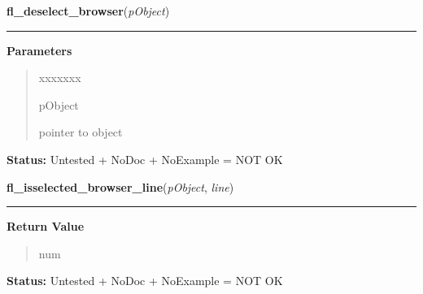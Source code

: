 \hspace{.8\funcindent}\begin{boxedminipage}{\funcwidth}

    \raggedright \textbf{fl\_deselect\_browser}(\textit{pObject})

    \vspace{-1.5ex}

    \rule{\textwidth}{0.5\fboxrule}
\setlength{\parskip}{2ex}
\setlength{\parskip}{1ex}
      \textbf{Parameters}
      \vspace{-1ex}

      \begin{quote}
        \begin{Ventry}{xxxxxxx}

          \item[pObject]

          pointer to object

        \end{Ventry}

      \end{quote}

\textbf{Status:} Untested + NoDoc + NoExample = NOT OK



    \end{boxedminipage}

    \label{xformslib:library:fl_isselected_browser_line}

    \vspace{0.5ex}

\hspace{.8\funcindent}\begin{boxedminipage}{\funcwidth}

    \raggedright \textbf{fl\_isselected\_browser\_line}(\textit{pObject}, \textit{line})

    \vspace{-1.5ex}

    \rule{\textwidth}{0.5\fboxrule}
\setlength{\parskip}{2ex}
\setlength{\parskip}{1ex}
      \textbf{Return Value}
    \vspace{-1ex}

      \begin{quote}
      num

      \end{quote}

\textbf{Status:} Untested + NoDoc + NoExample = NOT OK



    \end{boxedminipage}

